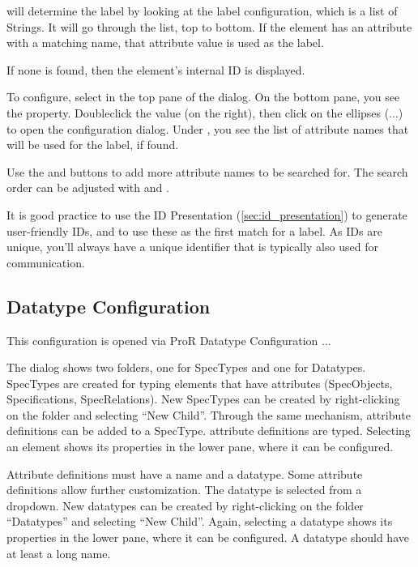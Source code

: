 \pror{} will determine the label by looking at the label configuration, which is a list of Strings.
It will go through the list, top to bottom.  If the element has an attribute with a matching name,
that attribute value is used as the label.

If none is found, then the element's internal ID is displayed.

To configure, select  in the top pane of the dialog.  On the bottom pane,
you see the  property.  Doubleclick the value (on the right), then click on the
ellipses (...) to open the configuration dialog.  Under , you see the list of attribute
names that will be used for the label, if found.

Use the  and  buttons to add more attribute names to be searched for.  The
search order can be adjusted with  and .

\begin{info}
It is good practice to use the ID Presentation (\ref{sec:id_presentation}) to generate
user-friendly IDs, and to use these as the first match for a label.  As IDs are unique, you'll always
have a unique identifier that is typically also used for communication.
\end{info}

\subsection{Datatype Configuration}
\label{sec:datatype_configuration}

This configuration is opened via ProR \textbar{} Datatype Configuration
...

The dialog shows two folders, one for SpecTypes and one for Datatypes.
SpecTypes are created for typing elements that have attributes
(SpecObjects, Specifications, SpecRelations).  New SpecTypes can be
created by right-clicking on the folder and selecting ``New Child''.
Through the same mechanism, attribute definitions can be added to a
SpecType.  attribute definitions are typed.  Selecting an element shows
its properties in the lower pane, where it can be configured.

Attribute definitions must have a name and a datatype.  Some attribute
definitions allow further customization.  The datatype is selected from a
dropdown.  New datatypes can be created by right-clicking on the folder
``Datatypes'' and selecting ``New Child''.  Again, selecting a datatype
shows its properties in the lower pane, where it can be configured.  A
datatype should have at least a long name.

